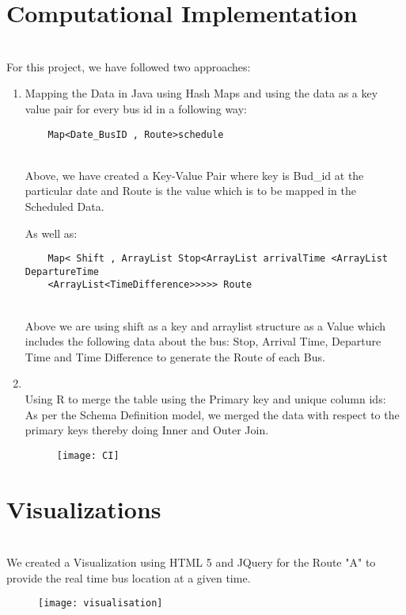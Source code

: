 \documentclass[12pt]{article}
\begin{document}
\section{Computational Implementation}
\\ For this project, we have followed two approaches:
\begin{enumerate}
	\item Mapping the Data in Java using Hash Maps and using the data as a key value pair for every bus id in a following way:
	\begin{verbatim}
	Map<Date_BusID , Route>schedule
	\end{verbatim}
	\\Above, we have created a Key-Value Pair where key is Bud_id at the particular date and Route is the value which is to be mapped in the Scheduled Data.
	
	As well as:
	
	\begin{verbatim}
	Map< Shift , ArrayList Stop<ArrayList arrivalTime <ArrayList DepartureTime
	<ArrayList<TimeDifference>>>>> Route
	\end{verbatim}
	\\Above we are using shift as a key and arraylist structure as a Value which includes the following data about the bus: Stop, Arrival Time, Departure Time and Time Difference to generate the Route of each Bus.
	
	\item \\Using R to merge the table using the Primary key and unique column ids: 
	\\As per the Schema Definition model, we merged the data with respect to the primary keys thereby doing Inner and Outer Join.
	\begin{figure}[ht!]
		
		\centering
		\texttt{[image: CI]}
		
	\end{figure}
\end{enumerate}



\section{Visualizations}
\\We created a Visualization using HTML 5 and JQuery for the Route "A" to provide the real time bus location at a given time.

\begin{figure}[ht!]
	
	\centering
	\texttt{[image: visualisation]}

\end{figure}
	\break
	
\end{document}
